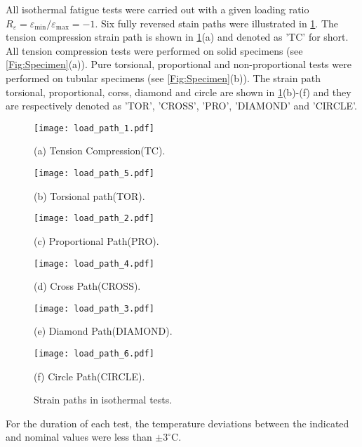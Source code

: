 All isothermal fatigue tests were carried out with a given loading ratio $R_{\varepsilon}=\varepsilon_{\min}/\varepsilon_{\max}=-1$.
Six fully reversed stain paths were illustrated in \ref{Fig:LoadPath}.
The tension compression strain path is shown in \ref{Fig:LoadPath}(a) and denoted as 'TC' for short.
All tension compression tests were performed on solid specimens (see \ref{Fig:Specimen}(a)).
Pure torsional, proportional and non-proportional tests were performed on tubular specimens (see \ref{Fig:Specimen}(b)).
The strain path torsional, proportional, corss, diamond and circle are shown in \ref{Fig:LoadPath}(b)-(f) and they are respectively denoted as 'TOR', 'CROSS', 'PRO', 'DIAMOND' and 'CIRCLE'.

\begin{figure}
  \begin{minipage}[t]{0.5\linewidth}
  \nonumber
    \centering
    \texttt{[image: load\_path\_1.pdf]}
    \centerline{\small (a) Tension Compression(TC).}
  \end{minipage}%
  \begin{minipage}[t]{0.5\linewidth}
    \centering
    \texttt{[image: load\_path\_5.pdf]}
    \centerline{\small (b) Torsional path(TOR).}
  \end{minipage}
  \begin{minipage}[t]{0.5\linewidth}
  \nonumber
    \centering
    \texttt{[image: load\_path\_2.pdf]}
    \centerline{\small (c) Proportional Path(PRO).}
  \end{minipage}%
  \begin{minipage}[t]{0.5\linewidth}
    \centering
    \texttt{[image: load\_path\_4.pdf]}
    \centerline{\small (d) Cross Path(CROSS).}
  \end{minipage}
  \begin{minipage}[t]{0.5\linewidth}
  \nonumber
    \centering
    \texttt{[image: load\_path\_3.pdf]}
    \centerline{\small (e) Diamond Path(DIAMOND).}
  \end{minipage}%
  \begin{minipage}[t]{0.5\linewidth}
    \centering
    \texttt{[image: load\_path\_6.pdf]}
    \centerline{\small (f) Circle Path(CIRCLE).}
  \end{minipage}
  \caption{Strain paths in isothermal tests.}
  \label{Fig:LoadPath}
\end{figure}

For the duration of each test, the temperature deviations between the indicated and nominal values were less than $\pm3^{\circ}$C.


